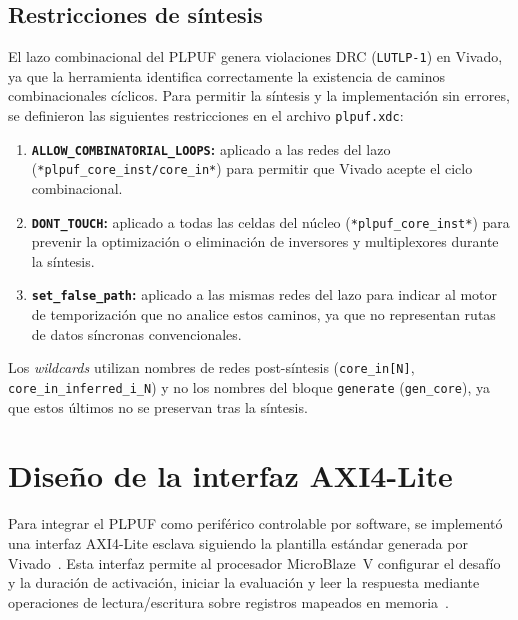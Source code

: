 \subsection{Restricciones de síntesis}
\label{sec:constraints}

El lazo combinacional del PLPUF genera violaciones DRC (\texttt{LUTLP-1}) en
Vivado, ya que la herramienta identifica correctamente la existencia de
caminos combinacionales cíclicos. Para permitir la síntesis y la
implementación sin errores, se definieron las siguientes restricciones en el
archivo \texttt{plpuf.xdc}:

\begin{enumerate}
  \item \textbf{\texttt{ALLOW\_COMBINATORIAL\_LOOPS}:} aplicado a las redes
    del lazo (\texttt{*plpuf\_core\_inst/core\_in*}) para permitir que Vivado
    acepte el ciclo combinacional.

  \item \textbf{\texttt{DONT\_TOUCH}:} aplicado a todas las celdas del
    núcleo (\texttt{*plpuf\_core\_inst*}) para prevenir la optimización o
    eliminación de inversores y multiplexores durante la síntesis.

  \item \textbf{\texttt{set\_false\_path}:} aplicado a las mismas redes del
    lazo para indicar al motor de temporización que no analice estos caminos,
    ya que no representan rutas de datos síncronas convencionales.
\end{enumerate}

Los \textit{wildcards} utilizan nombres de redes post-síntesis
(\texttt{core\_in[N]}, \texttt{core\_in\_inferred\_i\_N}) y no los nombres
del bloque \texttt{generate} (\texttt{gen\_core}), ya que estos últimos no
se preservan tras la síntesis.

\section{Diseño de la interfaz AXI4-Lite}
\label{sec:diseno_axi}

Para integrar el PLPUF como periférico controlable por software, se
implementó una interfaz AXI4-Lite esclava siguiendo la plantilla estándar
generada por Vivado~\cite{ug1037}. Esta interfaz permite al procesador
MicroBlaze~V configurar el desafío y la duración de activación, iniciar la
evaluación y leer la respuesta mediante operaciones de lectura/escritura
sobre registros mapeados en memoria~\cite{ihi0022h}.

